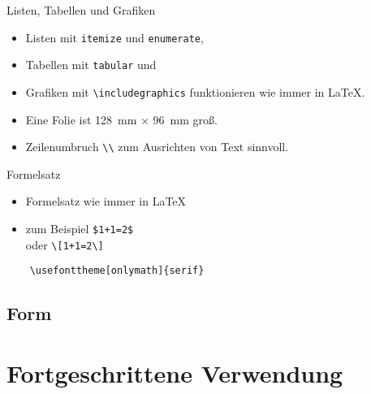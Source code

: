 \begin{Frame}[fragile]{Listen, Tabellen und Grafiken}
  \begin{itemize}
    \item Listen mit \lstinline-itemize- und \lstinline-enumerate-,
    \item Tabellen mit \lstinline-tabular- und
    \item Grafiken mit \lstinline-\includegraphics- funktionieren wie immer in \LaTeX.
  \end{itemize}

  \xxx

  \begin{itemize}
    \item Eine Folie ist 128~mm $\times$ 96~mm groß.
    \item Zeilenumbruch \lstinline-\\- zum Ausrichten von Text sinnvoll.
  \end{itemize}
\end{Frame}

\begin{Frame}[fragile]{Formelsatz}
  \begin{itemize}
    \item Formelsatz wie immer in \LaTeX
    \item zum Beispiel \lstinline-$1+1=2$-\\
      oder \lstinline-\[1+1=2\]-
  \end{itemize}

  \xxx

  \begin{lstlisting}[gobble=4]
    % Formeln mit Serifen setzen
    \usefonttheme[onlymath]{serif}
  \end{lstlisting}
\end{Frame}




\subsection{Form}




\section{Fortgeschrittene Verwendung}


